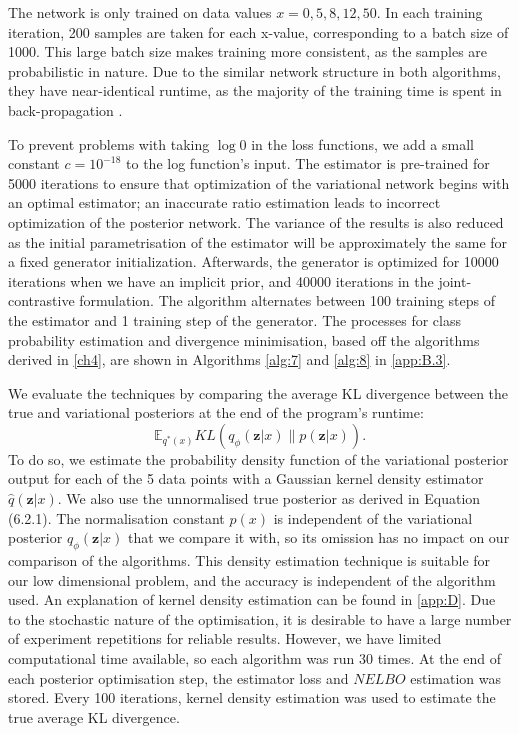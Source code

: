 \documentclass[honours,12pt]{unswthesis}
\newcommand{\E}{\mathbb{E}}
\numberwithin{equation}{section}
\theoremstyle{definition}
\begin{document}
The network is only trained on data values $x=0,5,8,12,50$. In each training iteration, 200 samples are taken for each x-value, corresponding to a batch size of 1000. This large batch size makes training more consistent, as the samples are probabilistic in nature. Due to the similar network structure in both algorithms, they have near-identical runtime, as the majority of the training time is spent in back-propagation \citep{DeepLearning}.

To prevent problems with taking $\log 0$ in the loss functions, we add a small constant $c=10^{-18}$ to the log function's input. The estimator is pre-trained for 5000 iterations to ensure that optimization of the variational network begins with an optimal estimator; an inaccurate ratio estimation leads to incorrect optimization of the posterior network. The variance of the results is also reduced as the initial parametrisation of the estimator will be approximately the same for a fixed generator initialization. Afterwards, the generator is optimized for 10000 iterations when we have an implicit prior, and 40000 iterations in the joint-contrastive formulation. The algorithm alternates between 100 training steps of the estimator and 1 training step of the generator. The processes for class probability estimation and divergence minimisation, based off the algorithms derived in \autoref{ch4}, are shown in Algorithms \ref{alg:7} and \ref{alg:8} in \autoref{app:B.3}.

We evaluate the techniques by comparing the average KL divergence between the true and variational posteriors at the end of the program's runtime: \[\E_{q^*(x)}KL(q_\phi(\bm{z}|x)\|p(\bm{z}|x)).\] To do so, we estimate the probability density function of the variational posterior output for each of the 5 data points with a Gaussian kernel density estimator $\hat{q}(\bm{z}|x)$. We also use the unnormalised true posterior as derived in Equation (6.2.1). The normalisation constant $p(x)$ is independent of the variational posterior $q_\phi(\bm{z}|x)$ that we compare it with, so its omission has no impact on our comparison of the algorithms. This density estimation technique is suitable for our low dimensional problem, and the accuracy is independent of the algorithm used. An explanation of kernel density estimation can be found in \autoref{app:D}. Due to the stochastic nature of the optimisation, it is desirable to have a large number of experiment repetitions for reliable results. However, we have limited computational time available, so each algorithm was run 30 times. At the end of each posterior optimisation step, the estimator loss and $NELBO$ estimation was stored. Every 100 iterations, kernel density estimation was used to estimate the true average KL divergence.
\end{document}
